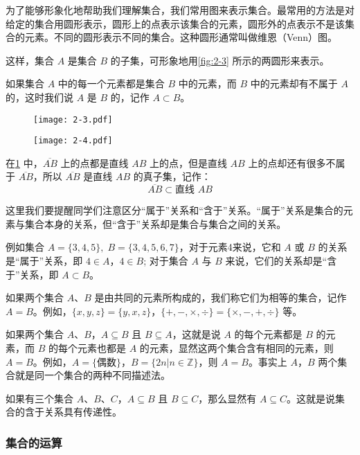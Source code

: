 为了能够形象化地帮助我们理解集合，我们常用图来表示集合。最常用的方法是对给定的集合用圆形表示，圆形上的点表示该集合的元素，圆形外的点表示不是该集合的元素。不同的圆形表示不同的集合。这种圆形通常叫做维恩（Venn）图。

这样，集合 $A$ 是集合 $B$ 的子集，可形象地用\cref{fig:2-3} 所示的两圆形来表示。

如果集合 $A$ 中的每一个元素都是集合 $B$ 中的元素，而 $B$ 中的元素却有不属于 $A$ 的，这时我们说 $A$ 是 $B$ 的，记作 $A\subset B$。
\begin{figure}
	\begin{minipage}[b]{0.48\linewidth}
		\centering
		\texttt{[image: 2-3.pdf]}
		\caption{}\label{fig:2-3}
	\end{minipage}
	\begin{minipage}[b]{0.48\linewidth}
		\centering
		\texttt{[image: 2-4.pdf]}
		\caption{}\label{fig:2-4}
	\end{minipage}
\end{figure}

在\cref{fig:2-4} 中，$\overline{AB}$ 上的点都是直线 $AB$ 上的点，但是直线 $AB$ 上的点却还有很多不属于 $\overline{AB}$，所以 $\overline{AB}$ 是直线 $AB$ 的真子集，记作：
\[\overline{AB}\subset \text{直线 } AB\]

这里我们要提醒同学们注意区分“属于”关系和“含于”关系。“属于”关系是集合的元素与集合本身的关系，但“含于”关系却是集合与集合之间的关系。

例如集合 $A=\{3, 4, 5\},\; B=\{3, 4, 5, 6, 7\}$，对于元素4来说，它和 $A$ 或 $B$ 的关系是“属于”关系，即 $4\in A$，$4\in B$; 对于集合 $A$ 与 $B$ 来说，它们的关系却是“含于”关系，即 $A\subset B$。

如果两个集合 $A$、$B$ 是由共同的元素所构成的，我们称它们为相等的集合，记作 $A=B$。例如，$\{x,y,z\}=\{y,x, z\}$，$\{+, -, \times, \div \}=\{ \times, -,+,\div\}$ 等。

如果两个集合 $A$、$B$，$A\subseteq B$ 且 $B\subseteq A$，这就是说 $A$ 的每个元素都是 $B$ 的元素，而 $B$ 的每个元素也都是 $A$ 的元素，显然这两个集合含有相同的元素，则 $A=B$。例如，$A=\{\text{偶数}\}$，$B=\{2n|n\in\mathbb{Z}\}$，则 $A=B$。事实上 $A$，$B$ 两个集合就是同一个集合的两种不同描述法。

如果有三个集合 $A$、$B$、$C$，$A\subseteq B$ 且 $B\subseteq C$，那么显然有 $A\subseteq C$。这就是说集合的含于关系具有传递性。

\subsubsection{集合的运算}

